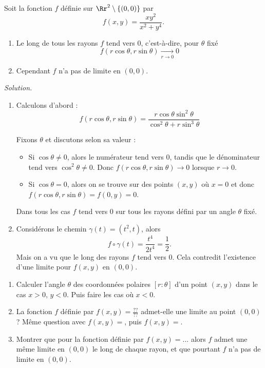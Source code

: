 \documentclass[12pt, class=report,crop=false]{standalone}
\begin{document}
\begin{exemple}
Soit la fonction $f$ définie sur $\Rr^2 \setminus \{(0,0)\}$ par
$$f(x,y)=\frac{xy^2}{x^2+y^4}.$$
\begin{enumerate}
  \item Le long de tous les rayons $f$ tend vers $0$, c'est-à-dire, pour $\theta$ fixé
$$f(r\cos\theta,r\sin\theta) \underset{r \to 0}{\longrightarrow} 0$$
  \item Cependant $f$ n'a pas de limite en $(0,0)$.
\end{enumerate}


\bigskip
\emph{Solution.}
\begin{enumerate}
  \item Calculons d'abord :
  $$f(r\cos\theta,r\sin\theta) 
  = \frac{r\cos\theta\sin^2\theta}{\cos^2\theta + r\sin^3\theta}$$
  
  Fixons $\theta$ et discutons selon sa valeur :
  \begin{itemize}
    \item Si $\cos\theta \neq 0$, alors le numérateur tend vers $0$, tandis que le dénominateur tend vers $\cos^2\theta \neq0$. Donc $f(r\cos\theta,r\sin\theta) \to 0$ lorsque $r\to0$.
    
    \item Si $\cos\theta = 0$, alors on se trouve sur des points $(x,y)$ où $x=0$ et donc 
    $f(r\cos\theta,r\sin\theta)=f(0,y)=0$.    
  \end{itemize}
  Dans tous les cas $f$ tend vers $0$ sur tous les rayons défini par un angle $\theta$ fixé.
  
  
  \item Considérons le chemin $\gamma(t) = (t^2,t)$, alors 
  $$f \circ \gamma(t) = \frac{t^4}{2t^4} = \frac12.$$
  Mais on a vu que le long des rayons $f$ tend vers $0$. 
  Cela contredit l'existence d'une limite pour $f(x,y)$ en $(0,0)$.
 

\end{enumerate}  

\end{exemple}
 
\begin{miniexercices}
\sauteligne
\begin{enumerate}

 \item Calculer l'angle $\theta$ des coordonnées polaires $[r:\theta]$ 
 d'un point $(x,y)$ dans le cas $x>0$, $y <0$. 
 Puis faire les cas où $x<0$.

  \item La fonction $f$ définie par $f(x,y)=\frac{??}{??}$  
  admet-elle une limite au point $(0,0)$ ?
  Même question avec $f(x,y)=$, puis $f(x,y)=$.

  \item Montrer que pour la fonction définie par $f(x,y)=...$ alors $f$ admet une    même limite en $(0,0)$ le long de chaque rayon, et que pourtant $f$ n'a pas de limite en $(0,0)$.
\end{enumerate}
\end{miniexercices}
\end{document}
